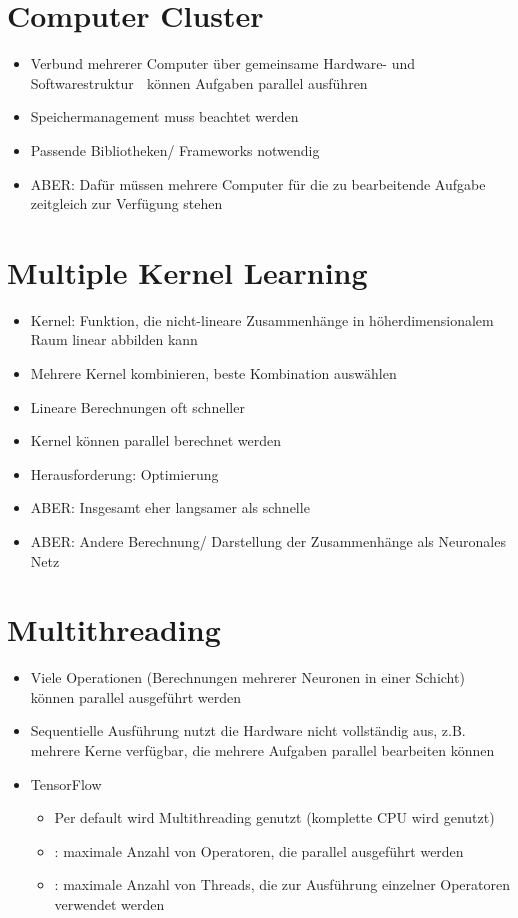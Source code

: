 \section{Computer Cluster}

\begin{itemize}
  \item Verbund mehrerer Computer über gemeinsame Hardware- und Softwarestruktur  können Aufgaben parallel ausführen
  \item Speichermanagement muss beachtet werden
  \item Passende Bibliotheken/ Frameworks notwendig
  \item ABER: Dafür müssen mehrere Computer für die zu bearbeitende Aufgabe zeitgleich zur Verfügung stehen
\end{itemize}

\section{Multiple Kernel Learning}


\begin{itemize}
	\item Kernel: Funktion, die nicht-lineare Zusammenhänge in höherdimensionalem Raum linear abbilden kann
	\item Mehrere Kernel kombinieren, beste Kombination auswählen
	\item Lineare Berechnungen oft schneller
	\item Kernel können parallel berechnet werden
	\item Herausforderung: Optimierung
	\item ABER: Insgesamt eher langsamer als schnelle
	\item ABER: Andere Berechnung/ Darstellung der Zusammenhänge als Neuronales Netz
\end{itemize}

\section{Multithreading}

\begin{itemize}
  \item Viele Operationen (Berechnungen mehrerer Neuronen in einer Schicht) können parallel ausgeführt werden
  \item Sequentielle Ausführung nutzt die Hardware nicht vollständig aus, z.B. mehrere Kerne verfügbar, die mehrere Aufgaben parallel bearbeiten können
  \item TensorFlow
    \begin{itemize}
      \item Per default wird Multithreading genutzt (komplette CPU wird genutzt)
      \item {}: maximale Anzahl von Operatoren, die parallel ausgeführt werden
      \item {}: maximale Anzahl von Threads, die zur Ausführung einzelner Operatoren verwendet werden
    \end{itemize}	
\end{itemize}



